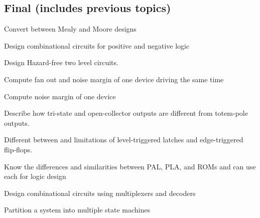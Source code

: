 \documentclass[options]{article}
\newcommand{\cmark}{\ding{51}}%
\newcommand{\done}{\rlap{$\square$}{\raisebox{2pt}{\large\hspace{1pt}\cmark}}%
  \hspace{-2.5pt}}
\begin{document}
\subsection{Final (includes previous topics)}
\begin{todolist}
  \item Convert between Mealy and Moore designs
  \item  Design combinational circuits for positive and negative logic
  \item  Design Hazard-free two level circuits.
  \item Compute fan out and noise margin of one device driving the same time
  \item Compute noise margin of one device
  \item Describe how tri-state and open-collector outputs are different from totem-pole outputs.
  \item Different between and limitations of level-triggered latches and edge-triggered flip-flops.
  \item Know the differences and similarities between PAL, PLA, and ROMs and can use each for logic design
  \item Design combinational circuits using multiplexers and decoders
  \item Partition a system into multiple state machines
\end{todolist}

\end{document}

